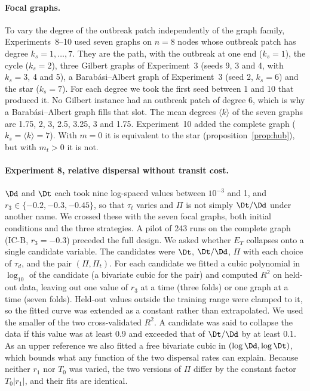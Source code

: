\paragraph{Focal graphs.} To vary the degree of the outbreak patch independently of the graph family, Experiments~8--10 used seven graphs on $n = 8$ nodes whose outbreak patch has degree $k_s = 1,\dots,7$. They are the path, with the outbreak at one end ($k_s=1$), the cycle ($k_s=2$), three Gilbert graphs of Experiment~3 (seeds 9, 3 and 4, with $k_s = 3$, 4 and 5), a Barab\'asi--Albert graph of Experiment~3 (seed 2, $k_s = 6$) and the star ($k_s = 7$). For each degree we took the first seed between 1 and 10 that produced it. No Gilbert instance had an outbreak patch of degree 6, which is why a Barab\'asi--Albert graph fills that slot. The mean degrees $\langle k\rangle$ of the seven graphs are 1.75, 2, 3, 2.5, 3.25, 3 and 1.75. Experiment~10 added the complete graph ($k_s = \langle k\rangle = 7$). With $m = 0$ it is equivalent to the star (proposition~\ref{prop:hub}), but with $m_t > 0$ it is not.

\paragraph{Experiment 8, relative dispersal without transit cost.} $\Dd$ and $\Dt$ each took nine log-spaced values between $10^{-3}$ and 1, and $r_3 \in \{-0.2, -0.3, -0.45\}$, so that $\tau_t$ varies and $\Pi$ is not simply $\Dt/\Dd$ under another name. We crossed these with the seven focal graphs, both initial conditions and the three strategies. A pilot of 243 runs on the complete graph (IC-B, $r_3=-0.3$) preceded the full design. We asked whether $E_T$ collapses onto a single candidate variable. The candidates were $\Dt$, $\Dt/\Dd$, $\Pi$ with each choice of $\tau_d$, and the pair $(\Pi, \Pi_t)$. For each candidate we fitted a cubic polynomial in $\log_{10}$ of the candidate (a bivariate cubic for the pair) and computed $R^2$ on held-out data, leaving out one value of $r_3$ at a time (three folds) or one graph at a time (seven folds). Held-out values outside the training range were clamped to it, so the fitted curve was extended as a constant rather than extrapolated. We used the smaller of the two cross-validated $R^2$. A candidate was said to collapse the data if this value was at least 0.9 and exceeded that of $\Dt/\Dd$ by at least 0.1. As an upper reference we also fitted a free bivariate cubic in $(\log\Dd, \log\Dt)$, which bounds what any function of the two dispersal rates can explain. Because neither $r_1$ nor $T_0$ was varied, the two versions of $\Pi$ differ by the constant factor $T_0|r_1|$, and their fits are identical.


